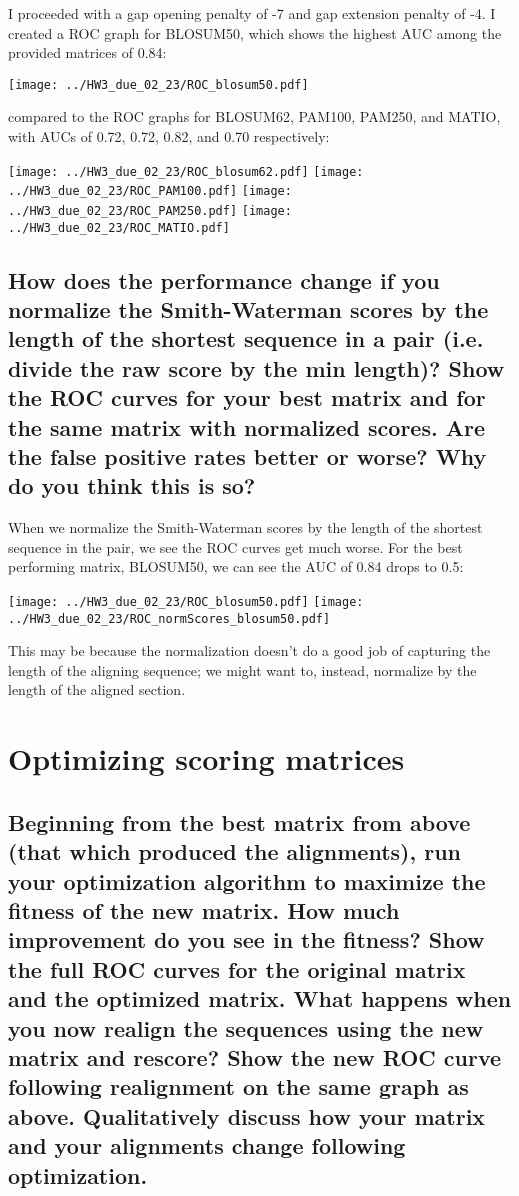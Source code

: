\documentclass[]{article}
\begin{document}
I proceeded with a gap opening penalty of -7 and gap extension penalty of -4. I created a ROC graph for BLOSUM50, which shows the highest AUC among the provided matrices of 0.84:

\vspace{1em}
\texttt{[image: ../HW3\_due\_02\_23/ROC\_blosum50.pdf]}
\vspace{1em}

compared to the ROC graphs for BLOSUM62, PAM100, PAM250, and MATIO, with AUCs of 0.72, 0.72, 0.82, and 0.70 respectively:

\vspace{1em}
\texttt{[image: ../HW3\_due\_02\_23/ROC\_blosum62.pdf]}
\texttt{[image: ../HW3\_due\_02\_23/ROC\_PAM100.pdf]}
\texttt{[image: ../HW3\_due\_02\_23/ROC\_PAM250.pdf]}
\texttt{[image: ../HW3\_due\_02\_23/ROC\_MATIO.pdf]}
\vspace{1em}


\subsection{How does the performance change if you normalize the Smith-Waterman scores by the length of the shortest sequence in a pair (i.e. divide the raw score by the min length)? Show the ROC curves for your best matrix and for the same matrix with normalized scores. Are the false positive rates better or worse? Why do you think this is so?}

When we normalize the Smith-Waterman scores by the length of the shortest sequence in the pair, we see the ROC curves get much worse. For the best performing matrix, BLOSUM50, we can see the AUC of 0.84 drops to 0.5:

\vspace{1em}
\texttt{[image: ../HW3\_due\_02\_23/ROC\_blosum50.pdf]}
\texttt{[image: ../HW3\_due\_02\_23/ROC\_normScores\_blosum50.pdf]}
\vspace{1em}

This may be because the normalization doesn't do a good job of capturing the length of the aligning sequence; we might want to, instead, normalize by the length of the aligned section.

\section{Optimizing scoring matrices}
\setcounter{subsection}{1}
\subsection{Beginning from the best matrix from above (that which produced the alignments), run your optimization algorithm to maximize the fitness of the new matrix. How much improvement do you see in the fitness? Show the full ROC curves for the original matrix and the optimized matrix. What happens when you now realign the sequences using the new matrix and rescore? Show the new ROC curve following realignment on the same graph as above. Qualitatively discuss how your matrix and your alignments change following optimization.}
\end{document}
